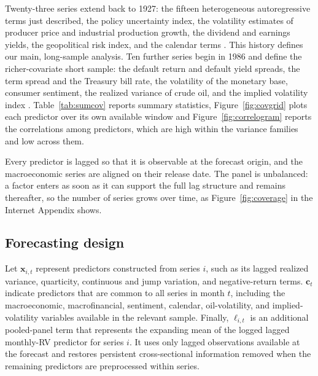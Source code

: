 \documentclass[preprint,12pt,authoryear]{elsarticle}
\begin{document}
Twenty-three series extend back to 1927: the fifteen heterogeneous autoregressive terms just described, the policy uncertainty index, the volatility estimates of producer price and industrial production growth, the dividend and earnings yields, the geopolitical risk index, and the calendar terms \citep{schwert1989, caldaraiacoviello2022, audrinosigristballinari2020, bakerbloomdavis2016}. This history defines our main, long-sample analysis. Ten further series begin in 1986 and define the richer-covariate short sample: the default return and default yield spreads, the term spread and the Treasury bill rate, the volatility of the monetary base, consumer sentiment, the realized variance of crude oil, and the implied volatility index \citep{paye2012, audrinosigristballinari2020, schwert1989, bekaerthoerova2014, fameliti2024macroeconomic}. Table~\ref{tab:sumcov} reports summary statistics,
Figure~\ref{fig:covgrid} plots each predictor over its own available window and Figure~\ref{fig:correlogram} reports the correlations among predictors, which are high within the variance families and low across them.

Every predictor is lagged so that it is observable at the forecast origin, and the macroeconomic series are aligned on their release date. The panel is unbalanced: a factor enters as soon as it can support the full lag structure and remains thereafter, so the number of series grows over time, as Figure~\ref{fig:coverage} in the Internet Appendix shows.


\subsection{Forecasting design}
\label{sec:design}

Let $\mathbf{x}_{i,t}$ represent predictors constructed from series $i$, such as its lagged realized variance, quarticity, continuous and jump variation, and negative-return terms. $\mathbf{c}_{t}$ indicate predictors that are common to all series in month $t$, including the macroeconomic, macrofinancial,
sentiment, calendar, oil-volatility, and implied-volatility variables available in the relevant sample. Finally, $\ell_{i,t}$ is an additional pooled-panel term that represents the expanding mean of the logged lagged monthly-RV predictor for series $i$. It uses only lagged observations available at the forecast and restores persistent cross-sectional information removed when the remaining predictors are preprocessed within series. 
\end{document}
